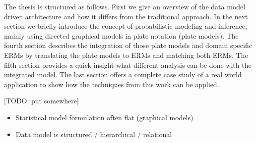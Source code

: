 The thesis is structured as follows. First we give an overview of the data model driven architecture and how it differs from the traditional approach. In the next section we briefly introduce the concept of probabilistic modeling and inference, mainly using directed graphical models in plate notation (plate models). The fourth section describes the integration of those plate models and domain specific ERMs by translating the plate models to ERMs and matching both ERMs. The fifth section provides a quick insight what different analysis can be done with the integrated model. The last section offers a complete case study of a real world application to show how the techniques from this work can be applied.

[TODO: put somewhere]
\begin{itemize}
\item Statistical model formulation often flat (graphical models)
\item Data model is structured / hierarchical / relational
\end{itemize}
